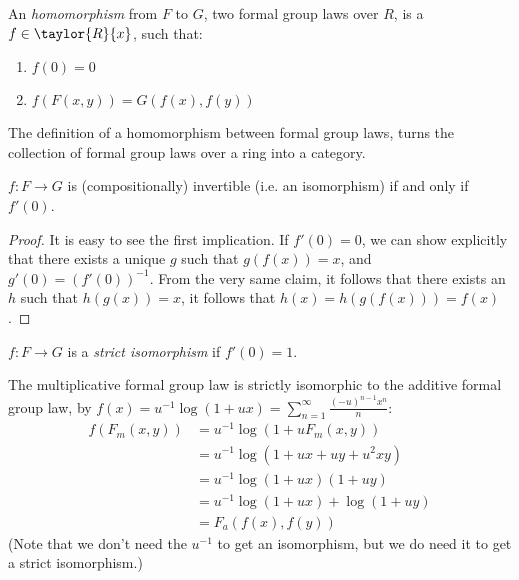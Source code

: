 \begin{definition*}
	An \emph{homomorphism} from $F$ to $G$, two formal group laws over $R$, is a $f \in \taylor{R}{x}$, such that:
	\begin{enumerate}
		\item $f\left(0\right) = 0$
		\item $f\left(F\left(x,y\right)\right) = G\left(f\left(x\right),f\left(y\right)\right)$
	\end{enumerate}
\end{definition*}

\begin{definition*}
	The definition of a homomorphism between formal group laws, turns the collection of formal group laws over a ring into a category.
\end{definition*}

\begin{claim*}
	$f: F \to G$ is (compositionally) invertible (i.e. an isomorphism) if and only if $f'\left(0\right)$.
\end{claim*}

\begin{proof}
	It is easy to see the first implication.
	If $f'\left(0\right) = 0$, we can show explicitly that there exists a unique $g$ such that $g\left(f\left(x\right)\right) = x$, and $g'\left(0\right) = \left(f'\left(0\right)\right)^{-1}$. From the very same claim, it follows that there exists an $h$ such that $h\left(g\left(x\right)\right) = x$, it follows that $h\left(x\right) = h\left(g\left(f\left(x\right)\right)\right) = f\left(x\right)$.
\end{proof}

\begin{definition*}
	$f: F \to G$ is a \emph{strict isomorphism} if $f'\left(0\right)=1$.
\end{definition*}

\begin{example*}
	The multiplicative formal group law is strictly isomorphic to the additive formal group law,
	by $f\left(x\right) = u^{-1} \log \left(1+ux\right) = \sum_{n=1}^{\infty} \frac{\left(-u\right)^{n-1} x^n}{n}$:
	\begin{align*}
		f\left(F_m\left(x,y\right)\right)
		&= u^{-1} \log \left(1+u F_m\left(x,y\right)\right)\\
		&= u^{-1} \log \left(1+ux+uy+u^2 xy\right)\\
		&= u^{-1} \log \left(1+ux\right)\left(1+uy\right)\\
		&= u^{-1} \log \left(1+ux\right) + \log \left(1+uy\right)\\
		&= F_a\left(f\left(x\right), f\left(y\right)\right)
	\end{align*}
	(Note that we don't need the $u^{-1}$ to get an isomorphism, but we do need it to get a strict isomorphism.)
\end{example*}

